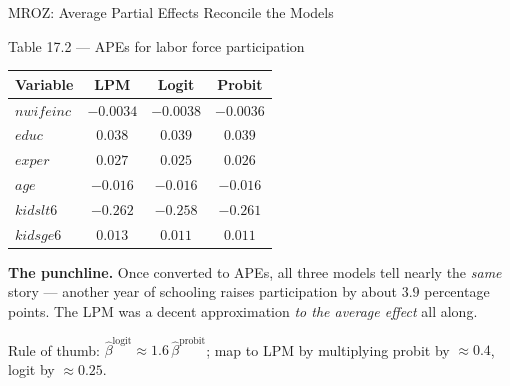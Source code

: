 \documentclass[aspectratio=169, 12pt]{beamer}
\begin{document}
\begin{frame}[shrink=8]{MROZ: Average Partial Effects Reconcile the Models}

  \begin{examplebox}{Table 17.2 --- APEs for labor force participation}
    \centering\footnotesize
    \begin{tabular}{l c c c}
      \toprule
      Variable & LPM & Logit & Probit \\
      \midrule
      $nwifeinc$ & $-0.0034$ & $-0.0038$ & $-0.0036$ \\
      $educ$     & $0.038$   & $0.039$   & $0.039$ \\
      $exper$    & $0.027$   & $0.025$   & $0.026$ \\
      $age$      & $-0.016$  & $-0.016$  & $-0.016$ \\
      $kidslt6$  & $-0.262$  & $-0.258$  & $-0.261$ \\
      $kidsge6$  & $0.013$   & $0.011$   & $0.011$ \\
      \bottomrule
    \end{tabular}
  \end{examplebox}

  \begin{highlightbox}
    \small
    \textbf{The punchline.} Once converted to APEs, all three models tell nearly
    the \emph{same} story --- another year of schooling raises participation by
    about $3.9$ percentage points. The LPM was a decent approximation
    \emph{to the average effect} all along.

    \smallskip
    Rule of thumb: $\hat\beta^{\text{logit}}\approx 1.6\,\hat\beta^{\text{probit}}$;
    map to LPM by multiplying probit by $\approx0.4$, logit by $\approx0.25$.
  \end{highlightbox}

\end{frame}
\end{document}
